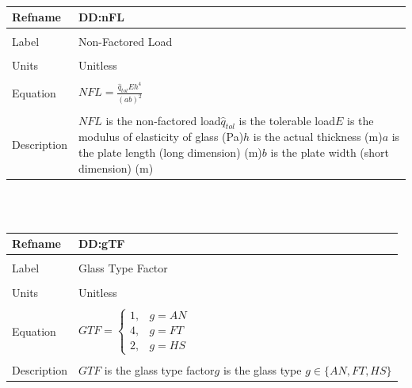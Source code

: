 \documentclass[12pt]{article}
\begin{document}
~\newline
\noindent \begin{minipage}{\textwidth}
\begin{tabular}{p{} p{}}
\toprule \textbf{Refname} & \textbf{DD:nFL}
\label{DD:nFL}
\\ \midrule \\
Label & Non-Factored Load
\\ \midrule \\
Units & Unitless
\\ \midrule \\
Equation & $NFL=\frac{{\hat{q}_{tol}} E h^{4}}{\left(a b\right)^{2}}$
\\ \midrule \\
Description & $NFL$ is the non-factored load\newline${\hat{q}_{tol}}$ is the tolerable load\newline$E$ is the modulus of elasticity of glass (Pa)\newline$h$ is the actual thickness (m)\newline$a$ is the plate length (long dimension) (m)\newline$b$ is the plate width (short dimension) (m)
\\ \bottomrule \end{tabular}
\end{minipage}\\
~\newline
\noindent \begin{minipage}{\textwidth}
\begin{tabular}{p{} p{}}
\toprule \textbf{Refname} & \textbf{DD:gTF}
\label{DD:gTF}
\\ \midrule \\
Label & Glass Type Factor
\\ \midrule \\
Units & Unitless
\\ \midrule \\
Equation & $GTF=\begin{cases}
1, & g=AN\\
4, & g=FT\\
2, & g=HS
\end{cases}$
\\ \midrule \\
Description & $GTF$ is the glass type factor\newline$g$ is the glass type $g\in{}\{AN,FT,HS\}$
\\ \bottomrule \end{tabular}
\end{minipage}\\
\end{document}
